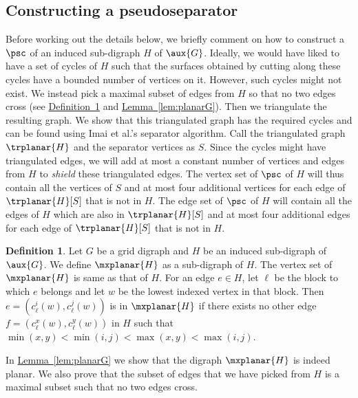 \documentclass[11pt]{article}
\numberwithin{equation}{section}
\theoremstyle{definition}
\newtheorem{definition}[theorem]{Definition}
\theoremstyle{plain}
\newcommand{\expref}[2]{\hyperref[#2]{#1~\ref{#2}}}
\begin{document}
\subsection{Constructing a pseudoseparator}
Before working out the details below, we briefly comment on how to construct a $\psc$ of
%
an induced%
sub-digraph %
 $H$ of $\aux{G}$. Ideally, we would have liked to have a set of cycles of $H$
%
%
%
%
%
%
such that the surfaces obtained by cutting along these cycles have %
a bounded number of vertices 
on it.%
However, such cycles might not exist. We instead pick a maximal subset of edges from $H$ so that no two edges cross (see \expref{Definition}{def:planar} and \expref{Lemma}{lem:planarG}). Then we triangulate the resulting graph. We show that this triangulated graph has the required cycles and can be found using Imai et al.'s separator algorithm. Call the triangulated graph %
$\trplanar{H}$ and the separator vertices as $S$. Since the cycles might have triangulated edges, we will add at most a constant number of vertices and edges from $H$ to \emph{shield} these triangulated edges. The vertex set of $\psc$ of $H$ will thus contain all the vertices of $S$ and at most four additional vertices for each edge of $\trplanar{H}[S]$ that is not %
 in $H$. The edge set of $\psc$ of $H$ will contain all the edges of $H$ which are also in $\trplanar{H}[S]$ and at most four additional edges for each edge of $\trplanar{H}[S]$ that is not %
 in $H$.

\begin{definition}
\label{def:planar}
Let $G$ be a grid %
digraph %
 and $H$ be
%
an induced  %
sub-digraph %
 of $\aux{G}$. We define $\mxplanar{H}$ as a  %
sub-digraph %
 of $H$. The vertex set of $\mxplanar{H}$ is same as that of $H$. For an edge $e \in H$, let ${\ell}$ be the block to which $e$ belongs and let $w$ be the lowest indexed vertex in that block. Then $e = (c^i_{\ell}(w), c^j_{\ell}(w))$ is in $\mxplanar{H}$ if there exists no other edge $f = (c^x_{\ell}(w), c^y_{\ell}(w))$ in $H$ such that $\min(x,y) < \min(i, j) < \max(x, y) < \max(i, j)$.
\end{definition}

In \expref{Lemma}{lem:planarG} we show that the %
digraph %
 $\mxplanar{H}$ is indeed planar. We also prove that the subset of edges that we have picked from $H$ is a maximal subset such that no two edges cross.
\end{document}
